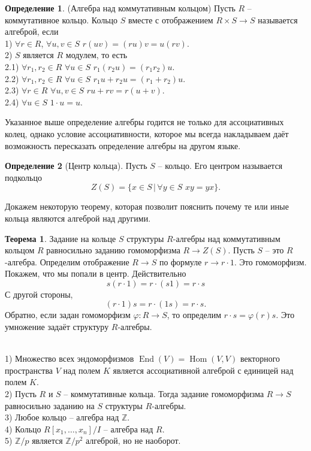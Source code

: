 \documentclass[10pt,a4paper,oneside]{book} %
\theoremstyle{definition}
\newtheorem*{defn}{Определение}
\newtheorem{thm}{Теорема}
\newcommand{\mb}[1]{\mathbb{#1}}
\newcommand{\Hom}{\operatorname{Hom}}
\newcommand{\End}{\operatorname{End}}
\def\exm{\noindent {\bf Примеры:}}
\def\ffi{\varphi}
\def\thrm{\begin{thm}}
\def\ethrm{\end{thm}}
\def\dfn{\begin{defn}}
\def\edfn{\end{defn}}
\begin{document}
\dfn(Алгебра над коммутативным кольцом) Пусть $R$ -- коммутативное кольцо. Кольцо $S$ вместе с отображением $R \times S \to S$ называется алгеброй, если \\
1) $\forall r \in R$, $\forall u,v \in S$ $r(uv)=(ru)v=u(rv)$.\\
2) $S$ является $R$ модулем, то есть \\
2.1) $\forall r_1,r_2 \in R$ $\forall u \in S$ $r_1(r_2u)=(r_1r_2)u$.\\
2.2) $\forall r_1,r_2 \in R$ $\forall u \in S$ $r_1u+r_2u=(r_1+r_2)u$.\\
2.3) $\forall r \in R$ $\forall u,v \in S$ $ru+rv=r(u+v)$.\\
2.4)  $\forall u\in S$ $1\cdot u=u$.
\edfn



Указанное выше определение алгебры годится не только для ассоциативных колец, однако условие ассоциативности, которое мы всегда накладываем даёт возможность пересказать определение алгебры на другом языке.

\dfn[Центр кольца] Пусть $S$ -- кольцо. Его центром называется подкольцо
$$Z(S)=\{x\in S\,|\, \forall y \in S \,\, xy=yx\}.$$
\edfn

Докажем некоторую теорему, которая позволит пояснить почему те или иные кольца являются алгеброй над другими.


\thrm Задание на кольце $S$ структуры $R$-алгебры над коммутативным кольцом $R$ равносильно заданию гомоморфизма $R \to Z(S)$.
\proof
Пусть $S$ -- это $R$-алгебра. Определим отображение $R\to S$ по формуле $r \to r\cdot 1$. Это гомоморфизм. Покажем, что мы попали в центр. Действительно
$$s(r\cdot 1)= r\cdot (s1)=r\cdot s$$
С другой стороны,
$$(r\cdot 1)s=r\cdot(1s)=r\cdot s.$$
Обратно, если задан гомоморфизм $\ffi \colon R \to S$, то определим $r\cdot s=\ffi(r)s$. Это умножение задаёт структуру $R$-алгебры.
\endproof
\ethrm

\exm \\
1) Множество всех эндоморфизмов $\End(V)=\Hom(V,V)$ векторного пространства $V$ над полем $K$ является ассоциативной алгеброй с единицей над полем $K$.\\
2) Пусть $R$ и $S$ -- коммутативные кольца. Тогда задание гомоморфизма $R \to S$ равносильно заданию на $S$ структуры $R$-алгебры. \\
3) Любое кольцо -- алгебра над $\mb Z$.\\
4) Кольцо $R[x_1,\dots,x_n]/I $ -- алгебра над $R$.\\
5) $\mb Z/p$ является $\mb Z/p^2$ алгеброй, но не наоборот.\\
\end{document}
